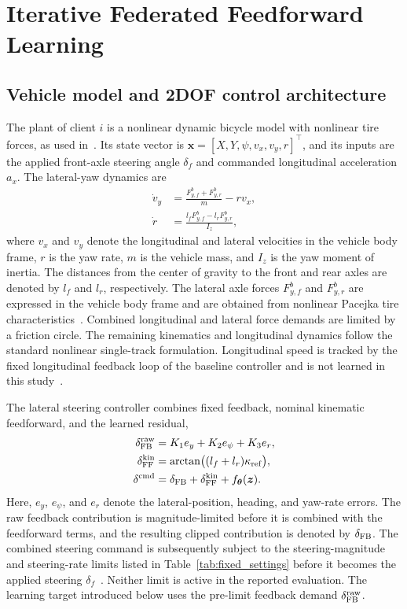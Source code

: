 \section{Iterative Federated Feedforward Learning}
\label{sec:method}
\subsection{Vehicle model and 2DOF control architecture}
%
The plant of client $i$ is a nonlinear dynamic bicycle model with nonlinear tire forces, as used in~\cite{weber2025_fed_FF}.
Its state vector is $\boldsymbol{x}=[X,Y,\psi,v_x,v_y,r]^\top$, and its inputs are the applied front-axle steering angle $\delta_f$ and commanded longitudinal acceleration $a_x$.
The lateral-yaw dynamics are
%
\begin{align}
    \dot v_y &= \frac{F^{b}_{y,f}+F^{b}_{y,r}}{m}-r v_x, \\
    \dot r &= \frac{l_f F^{b}_{y,f}-l_r F^{b}_{y,r}}{I_z},
    \label{eq:lateral_dynamics}
\end{align}
%
where $v_x$ and $v_y$ denote the longitudinal and lateral velocities in the vehicle body frame, $r$ is the yaw rate, $m$ is the vehicle mass, and $I_z$ is the yaw moment of inertia. 
The distances from the center of gravity to the front and rear axles are denoted by $l_f$ and $l_r$, respectively. 
The lateral axle forces $F_{y,f}^b$ and $F_{y,r}^b$ are expressed in the vehicle body frame and are obtained from nonlinear Pacejka tire characteristics~\cite{pacejka2026magic}.
Combined longitudinal and lateral force demands are limited by a friction circle.
The remaining kinematics and longitudinal dynamics follow the standard nonlinear single-track formulation.
Longitudinal speed is tracked by the fixed longitudinal feedback loop of the baseline controller and is not learned in this study~\cite{althoff2014online}.

The lateral steering controller combines fixed feedback, nominal kinematic feedforward, and the learned residual,
%
\begin{align}
    \delta_{\rm FB}^{\rm raw} &= K_1 e_y + K_2 e_\psi + K_3 e_r, \\
    \delta_{\rm FF}^{\rm kin} &= \arctan\!\big((l_f+l_r)\kappa_{\rm ref}\big),\\
    \delta^{\rm cmd} &= \delta_{\rm FB}+\delta_{\rm FF}^{\rm kin}+f_{\boldsymbol\theta}(\boldsymbol z).
    \label{eq:2dof_compact}
\end{align}
%
Here, $e_y$, $e_\psi$, and $e_r$ denote the lateral-position, heading, and yaw-rate errors.
The raw feedback contribution is magnitude-limited before it is combined with the feedforward terms, and the resulting clipped contribution is denoted by $\delta_{\rm FB}$.
The combined steering command is subsequently subject to the steering-magnitude and steering-rate limits listed in Table~\ref{tab:fixed_settings} before it becomes the applied steering $\delta_f$~\cite{althoff2014online}.
Neither limit is active in the reported evaluation.
The learning target introduced below uses the pre-limit feedback demand $\delta_{\rm FB}^{\rm raw}$.

